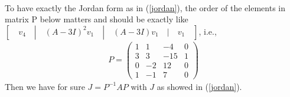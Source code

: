 \documentclass[12pt, letterpaper]{scrartcl}
\begin{document}
\begin{itemize}
\begin{align*}
    \end{align*}
    To have exactly the Jordan form as in (\ref{jordan}), the order of the elements in matrix P below matters and should be exactly like $[\quad v_4\quad|\quad(A-3I)^2v_1\quad|\quad(A-3I)v_1\quad|\quad v_1\quad]$, i.e.,
    \begin{align*}
        P=\left(
        \begin{array}{cccc}
          1&1&-4&0\\
          3&3&-15&1\\
          0&-2&12&0\\
          1&-1&7&0
        \end{array}
        \right)
    \end{align*}
    Then we have for sure $J = P^{-1}AP$ with $J$ as showed in (\ref{jordan}).
\end{itemize}
\end{document}
